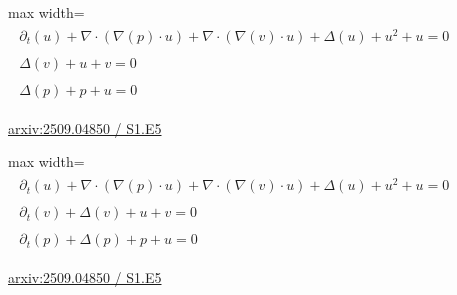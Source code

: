 \documentclass[10pt,a4paper]{article}
\begin{document}
\begin{minipage}{\linewidth}
\begin{center}\begin{adjustbox}{max width=\linewidth}$\displaystyle\begin{gathered}\begin{gathered}\partial_{t}(u)+\nabla\cdot(\nabla(p)\cdot u)+\nabla\cdot(\nabla(v)\cdot u)+\Delta(u)+u^{2}+u=0\end{gathered}\\[5pt]\begin{gathered}\Delta(v)+u+v=0\end{gathered}\\[5pt]\begin{gathered}\Delta(p)+p+u=0\end{gathered}\end{gathered}$\end{adjustbox}\end{center}
{\small \href{https://arxiv.org/html/2509.04850#S1.E5}{arxiv:2509.04850 / S1.E5}}\par
\end{minipage}\par\vspace{7mm}

\begin{minipage}{\linewidth}
\begin{center}\begin{adjustbox}{max width=\linewidth}$\displaystyle\begin{gathered}\begin{gathered}\partial_{t}(u)+\nabla\cdot(\nabla(p)\cdot u)+\nabla\cdot(\nabla(v)\cdot u)+\Delta(u)+u^{2}+u=0\end{gathered}\\[5pt]\begin{gathered}\partial_{t}(v)+\Delta(v)+u+v=0\end{gathered}\\[5pt]\begin{gathered}\partial_{t}(p)+\Delta(p)+p+u=0\end{gathered}\end{gathered}$\end{adjustbox}\end{center}
{\small \href{https://arxiv.org/html/2509.04850#S1.E5}{arxiv:2509.04850 / S1.E5}}\par
\end{minipage}\par\vspace{7mm}
\end{document}
